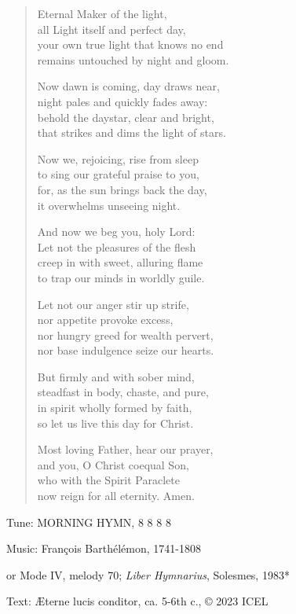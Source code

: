 \hymn

\begin{verse}
Eternal Maker of the light,\\
all Light itself and perfect day,\\
your own true light that knows no end\\
remains untouched by night and gloom.

Now dawn is coming, day draws near,\\
night pales and quickly fades away:\\
behold the daystar, clear and bright,\\
that strikes and dims the light of stars.

Now we, rejoicing, rise from sleep\\
to sing our grateful praise to you,\\
for, as the sun brings back the day,\\
it overwhelms unseeing night.

And now we beg you, holy Lord:\\
Let not the pleasures of the flesh\\
creep in with sweet, alluring flame\\
to trap our minds in worldly guile.

Let not our anger stir up strife,\\
nor appetite provoke excess,\\
nor hungry greed for wealth pervert,\\
nor base indulgence seize our hearts.

But firmly and with sober mind,\\
steadfast in body, chaste, and pure,\\
in spirit wholly formed by faith,\\
so let us live this day for Christ.

Most loving Father, hear our prayer,\\
and you, O Christ coequal Son,\\
who with the Spirit Paraclete\\
now reign for all eternity. Amen.
\end{verse}

\begin{hymnsource}
Tune: MORNING HYMN, 8 8 8 8

Music: François Barthélémon, 1741-1808

or Mode IV, melody 70; \emph{Liber Hymnarius}, Solesmes, 1983*

Text: Æterne lucis conditor, ca. 5-6th c., © 2023 ICEL
\end{hymnsource}